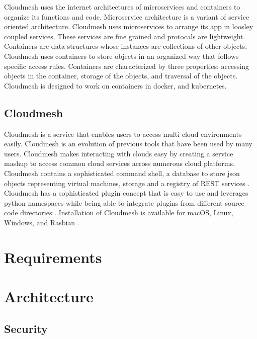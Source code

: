 Cloudmesh uses the internet architectures of microservices and
containers to organize its functions and code. Microservice architecture
is a variant of service oriented architecture. Cloudmesh uses
microservices to arrange its app in loosley coupled services. These
services are fine grained and protocals are lightweight. Containers are
data structures whose instances are collections of other objects.
Cloudmesh uses containers to store objects in an organized way that
follows specific access rules. Containers are characterized by three
properties: accessing objects in the container, storage of the objects,
and traversal of the objects. Cloudmesh is designed to work on
containers in docker, and kubernetes.


\subsection{Cloudmesh}\label{cloudmesh}

Cloudmesh \cite{cloudmesh-manual} is a service that enables users to
access multi-cloud environments easily. Cloudmesh is an evolution of
previous tools that have been used by many users. Cloudmesh makes
interacting with clouds easy by creating a service mashup to access
common cloud services across numerous cloud platforms. Cloudmesh
contains a sophisticated command shell, a database to store json
objects representing virtual machines, storage and a registry of REST
services \cite{cloudmesh-openapi}.  Cloudmesh has a sophisticated
plugin concept that is easy to use and leverages python namespaces
while being able to integrate plugins from different source code
directories \cite{cloudmesh-github}.  Installation of Cloudmesh is
available for macOS, Linux, Windows, and Rasbian
\cite{cloudmesh-manual}.



\section{Requirements}
\label{sec:requirements}




\section{Architecture}
\label{sec:architecture}

\subsection{Security}
\label{security}

